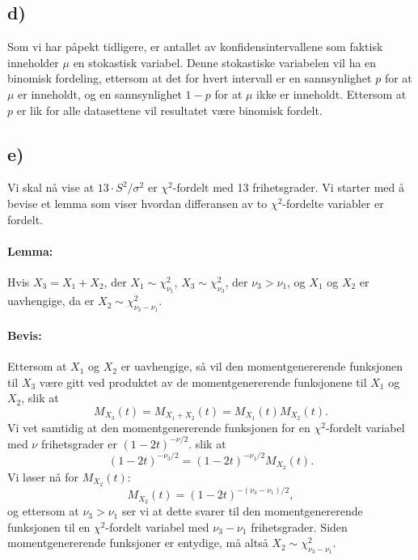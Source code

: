 \documentclass[a4paper, 11pt, titlepage, english]{article}
\begin{document}
\subsection*{d)}
Som vi har påpekt tidligere, er antallet av konfidensintervallene som faktisk inneholder $\mu$ en stokastisk variabel. Denne stokastiske variabelen vil ha en binomisk fordeling, ettersom at det for hvert intervall er en sannsynlighet $p$ for at $\mu$ er inneholdt, og en sannsynlighet $1-p$ for at $\mu$ ikke er inneholdt. Ettersom at $p$ er lik for alle datasettene vil resultatet være binomisk fordelt.

\clearpage

\subsection*{e)}
Vi skal nå vise at $13\cdot S^2/\sigma^2$ er $\chi^2$-fordelt med 13 frihetsgrader. Vi starter med å bevise et lemma som viser hvordan differansen av to $\chi^2$-fordelte variabler er fordelt.

\noindent\makebox[\linewidth]{\rule{\textwidth}{0.4pt}}
\paragraph{Lemma:} Hvis $X_3 = X_1 + X_2$, der $X_1\sim\chi_{\nu_1}^2$, $X_3\sim\chi_{\nu_3}^2$, der $\nu_3 > \nu_1$, og $X_1$ og $X_2$ er uavhengige, da er $X_2 \sim \chi^2_{\nu_3 - \nu_1}$.

\paragraph{Bevis:} Ettersom at $X_1$ og $X_2$ er uavhengige, så vil den momentgenererende funksjonen til $X_3$ være gitt ved produktet av de momentgenererende funksjonene til $X_1$ og $X_2$, slik at
$$M_{X_3}(t) = M_{X_1 + X_2}(t) = M_{X_1}(t)M_{X_2}(t).$$
Vi vet samtidig at den momentgenererende funksjonen for en $\chi^2$-fordelt variabel med $\nu$ frihetsgrader er $(1-2t)^{-\nu/2}$. slik at
$$(1-2t)^{-\nu_3/2} = (1-2t)^{-\nu_1/2}M_{X_2}(t).$$
Vi løser nå for $M_{X_2}(t)$:
$$M_{X_2}(t) = (1-2t)^{-(\nu_3 - \nu_1)/2},$$
og ettersom at $\nu_3 > \nu_1$ ser vi at dette svarer til den momentgenererende funksjonen til en $\chi^2$-fordelt variabel med $\nu_3 - \nu_1$ frihetsgrader. Siden momentgenererende funksjoner er entydige, må altså $X_2 \sim \chi^2_{\nu_3-\nu_1}$.

\noindent\makebox[\linewidth]{\rule{\textwidth}{0.4pt}}
\end{document}
